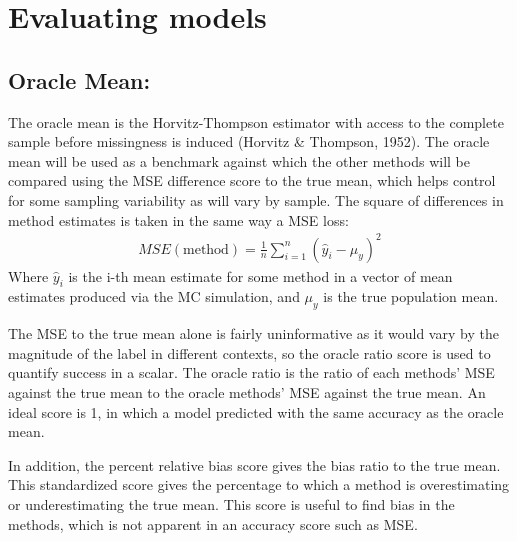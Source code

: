 \documentclass[12pt,twoside]{reedthesis}
\begin{document}
\section{Evaluating models}\label{evaluating-models}

\subsection{Oracle Mean:}\label{oracle-mean}

The oracle mean \label{eq:HTE} is the Horvitz-Thompson estimator with access
to the complete sample before missingness is induced (Horvitz \&
Thompson, 1952). The oracle mean will be used as a benchmark against
which the other methods will be compared using the MSE difference score
to the true mean, which helps control for some sampling variability as
\label{eq:HTE} will vary by sample. The square of differences in method
estimates is taken in the same way a MSE loss:
\begin{align}
MSE(\text{method}) = \frac{1}{n} \sum_{i=1}^n (\hat{y}_i - \mu_y)^2 \label{eq:MSEscore}
\end{align}
Where \(\hat{y}_i\) is the i-th mean estimate for some method in a
vector of mean estimates produced via the MC simulation, and \(\mu_y\)
is the true population mean.

The MSE to the true mean alone is fairly uninformative as it would vary
by the magnitude of the label in different contexts, so the oracle ratio
score is used to quantify success in a scalar. The oracle ratio is the
ratio of each methods' MSE against the true mean to the oracle methods'
MSE against the true mean. An ideal score is 1, in which a model
predicted with the same accuracy as the oracle mean.

In addition, the percent relative bias score gives the bias ratio to the
true mean. This standardized score gives the percentage to which a
method is overestimating or underestimating the true mean. This score is
useful to find bias in the methods, which is not apparent in an accuracy
score such as MSE.
\end{document}
